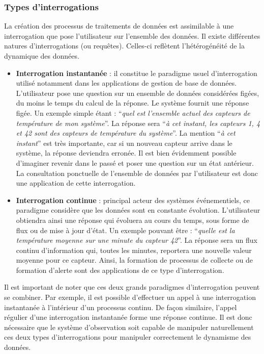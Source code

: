 \subsubsection{Types d'interrogations}
La création des processus de traitements de données est assimilable à une interrogation que pose l'utilisateur sur l'ensemble des données. Il existe différentes natures d'interrogations (ou requêtes). Celles-ci reflètent l'hétérogénéité de la dynamique des données.
\begin{itemize}
    \item \textbf{Interrogation instantanée} : il constitue le paradigme usuel d'interrogation utilisé notamment dans les applications de gestion de base de données. L'utilisateur pose une question sur un ensemble de données considérées figées, du moins le temps du calcul de la réponse. Le système fournit une réponse figée. Un exemple simple étant : \enquote{\it quel est l'ensemble actuel des capteurs de température de mon système}. La réponse sera \enquote{\it à cet instant, les capteurs 1, 4 et 42 sont des capteurs de température du système}. La mention \enquote{\it à cet instant} est très importante, car si un nouveau capteur arrive dans le système, la réponse deviendra erronée. Il est bien évidemment possible d'imaginer revenir dans le passé et poser une question sur un état antérieur. La consultation ponctuelle de l'ensemble de données par l'utilisateur est donc une application de cette interrogation.
    \item \textbf{Interrogation continue} : principal acteur des systèmes événementiels, ce paradigme considère que les données sont en constante évolution. L'utilisateur obtiendra ainsi une réponse qui évoluera au cours du temps, sous forme de flux ou de mise à jour d'état. Un exemple pouvant être : \enquote{\it quelle est la température moyenne sur une minute du capteur 42}. La réponse sera un flux continu d'information qui, toutes les minutes, reportera une nouvelle valeur moyenne pour ce capteur. Ainsi, la formation de processus de collecte ou de formation d'alerte sont des applications de ce type d'interrogation.
\end{itemize}
Il est important de noter que ces deux grands paradigmes d'interrogation peuvent se combiner. Par exemple, il est possible d'effectuer un appel à une interrogation instantanée à l'intérieur d'un processus continu. De façon similaire, l'appel régulier d'une interrogation instantanée forme une réponse continue. Il est donc nécessaire que le système d'observation soit capable de manipuler naturellement ces deux types d'interrogations pour manipuler correctement le dynamisme des données.

